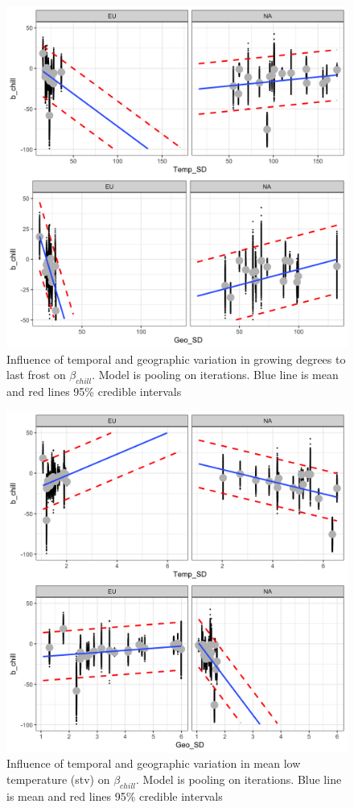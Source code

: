\documentclass[11pt]{article}
\begin{document}
\begin{figure}[h!]
    \centering
         \includegraphics[width=.9\textwidth]{..//figures/cheap_approach/modeled_gdd2lf.png}
    \caption{Influence of temporal and geographic variation in growing degrees to last frost on $\beta_{chill}$. Model is pooling on iterations. Blue line is mean and red lines 95\% credible intervals} 
    \label{fig:gddlf}
\end{figure}


\begin{figure}[h!]
    \centering
         \includegraphics[width=.9\textwidth]{..//figures/cheap_approach/modeled_stv.png}
    \caption{Influence of temporal and geographic variation in mean low temperature (stv) on $\beta_{chill}$. Model is pooling on iterations. Blue line is mean and red lines 95\% credible intervals} 
    \label{fig:stv}
\end{figure}
\end{document}
